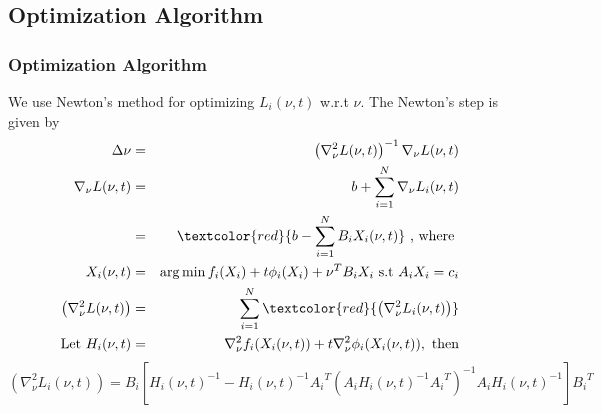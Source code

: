 \documentclass{beamer}
\newcommand\FontviNine{\fontsize{9}{7.2}\selectfont}
\begin{document}
\subsection{Optimization Algorithm}
\begin{frame}
\frametitle{Optimization Algorithm \cite{p1}}
\FontviNine
We use Newton's method for optimizing $L_i(\nu,t)$ w.r.t $\nu$. The Newton's step is given by
\begin{eqnarray}
\Delta \nu &=& \left(\nabla_{\nu}^2 L(\nu,t)\right)^{-1} \nabla_{\nu}L(\nu,t) \nonumber\\
\nabla_{\nu}L(\nu,t) &=& b + \sum_{i=1}^{N} \nabla_{\nu}L_{i}(\nu,t) \nonumber \\
&=& \textcolor{red}{b-\sum_{i=1}^{N} B_i X_i(\nu,t)} \text{ , where }\nonumber\\
X_{i}(\nu,t) &=& \mathrm{arg\,min}\, f_{i}(X_i) + t\phi_i(X_i) + {\nu}^{T} B_i X_i \text{ s.t } A_i X_i = c_i \nonumber\\
\left(\nabla_{\nu}^2 L(\nu,t)\right) &=& \sum_{i=1}^{N}\textcolor{red}{\left(\nabla_{\nu}^2 L_{i}(\nu,t)\right)} \nonumber\\
\text{Let }H_i(\nu,t) &=& \nabla_{\nu}^2 f_i(X_i(\nu,t)) + t \nabla_{\nu}^2 \phi_i(X_i(\nu,t)) , \text{ then} \nonumber
\end{eqnarray}
\begin{equation}
\left(\nabla_{\nu}^2 L_{i}(\nu,t)\right) = B_i\left[{H_{i}(\nu,t)}^{-1} - {H_i(\nu,t)}^{-1}{A_i}^T \left(A_i {H_i(\nu,t)}^{-1} {A_i}^{T} \right)^{-1} A_i {H_{i}(\nu,t)}^{-1} \right] {B_{i}}^{T} \nonumber
\end{equation}

\end{frame}
\end{document}
